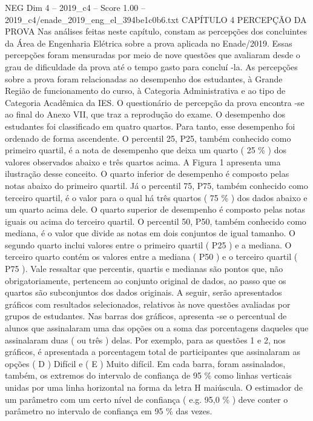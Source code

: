 \begin{textsample}{NEG Dim 4 – 2019\_c4 – Score 1.00 – 2019\_c4/enade\_2019\_eng\_el\_394be1c0b6.txt}  \label{ex:f4_neg_245}
CAPÍTULO 4 PERCEPÇÃO DA PROVA Nas análises feitas neste capítulo, constam as percepções dos concluintes da Área de Engenharia Elétrica sobre a prova aplicada no Enade/2019.
Essas percepções foram mensuradas por meio de nove questões que avaliaram desde o grau de dificuldade da prova até o tempo gasto para concluí -la.
As percepções sobre a prova foram relacionadas ao desempenho dos estudantes, à Grande Região de funcionamento do curso, à Categoria Administrativa e ao tipo de Categoria Acadêmica da IES.
O questionário de percepção da prova encontra -se ao final do Anexo VII, que traz a reprodução do exame.
O desempenho dos estudantes foi classificado em quatro quartos.
Para tanto, esse desempenho foi ordenado de forma ascendente.
O percentil 25, P25, também conhecido como primeiro quartil, é a nota de desempenho que deixa um quarto ( 25 \% ) dos valores observados abaixo e três quartos acima.
A Figura 1 apresenta uma ilustração desse conceito.
O quarto inferior de desempenho é composto pelas notas abaixo do primeiro quartil.
Já o percentil 75, P75, também conhecido como terceiro quartil, é o valor para o qual há três quartos ( 75 \% ) dos dados abaixo e um quarto acima dele.
O quarto superior de desempenho é composto pelas notas iguais ou acima do terceiro quartil.
O percentil 50, P50, também conhecido como mediana, é o valor que divide as notas em dois conjuntos de igual tamanho.
O segundo quarto inclui valores entre o primeiro quartil ( P25 ) e a mediana.
O terceiro quarto contém os valores entre a mediana ( P50 ) e o terceiro quartil ( P75 ).
Vale ressaltar que percentis, quartis e medianas são pontos que, não obrigatoriamente, pertencem ao conjunto original de dados, ao passo que os quartos são subconjuntos dos dados originais.
A seguir, serão apresentados gráficos com resultados selecionados, relativos às nove questões avaliadas por grupos de estudantes.
Nas barras dos gráficos, apresenta -se o percentual de alunos que assinalaram uma das opções ou a soma das porcentagens daqueles que assinalaram duas ( ou três ) delas.
Por exemplo, para as questões 1 e 2, nos gráficos, é apresentada a porcentagem total de participantes que assinalaram as opções ( D ) Difícil e ( E ) Muito difícil.
Em cada barra, foram assinalados, também, os extremos do intervalo de confiança de 95 \% como linhas verticais unidas por uma linha horizontal na forma da letra H maiúscula.
O estimador de um parâmetro com um certo nível de confiança ( e.g. 95,0 \% ) deve conter o parâmetro no intervalo de confiança em 95 \% das vezes.

\end{textsample}
